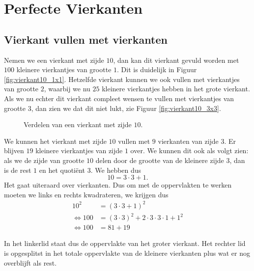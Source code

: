 
\section{Perfecte Vierkanten}

\subsection{Vierkant vullen met vierkanten}

Nemen we een vierkant met zijde $10$, dan kan dit vierkant gevuld worden met $100$ kleinere vierkantjes van grootte $1$. Dit is duidelijk in Figuur \ref{fig:vierkant10_1x1}. Hetzelfde vierkant kunnen we ook vullen met vierkantjes van grootte $2$, waarbij we nu $25$ kleinere vierkantjes hebben in het grote vierkant. Als we nu echter dit vierkant compleet wensen te vullen met vierkantjes van grootte $3$, dan zien we dat dit niet lukt, zie Figuur \ref{fig:vierkant10_3x3}.

\begin{figure}[ht]
  \centering
  \caption{Verdelen van een vierkant met zijde $10$.}
  \label{fig:vierkant10}
\end{figure}

We kunnen het vierkant met zijde $10$ vullen met $9$ vierkanten van zijde $3$. Er blijven $19$ kleinere vierkantjes van zijde $1$ over. We kunnen dit ook als volgt zien: als we de zijde van grootte $10$ delen door de grootte van de kleinere zijde $3$, dan is de rest $1$ en het quotiënt $3$. We hebben dus
$$
10 = 3\cdot 3 + 1.
$$
Het gaat uiteraard over vierkanten. Dus om met de oppervlakten te werken moeten we links en rechts kwadrateren, we krijgen dus
\begin{align*}
  10^2  &= (3\cdot 3 + 1)^2\\
  \Leftrightarrow 100   &= (3\cdot 3)^2 + 2\cdot 3\cdot 3\cdot 1 + 1^2\\
  \Leftrightarrow 100   &= 81 + 19
\end{align*}

In het linkerlid staat dus de oppervlakte van het groter vierkant. Het rechter lid is opgesplitst in het totale oppervlakte van de kleinere vierkanten plus wat er nog overblijft als rest.

